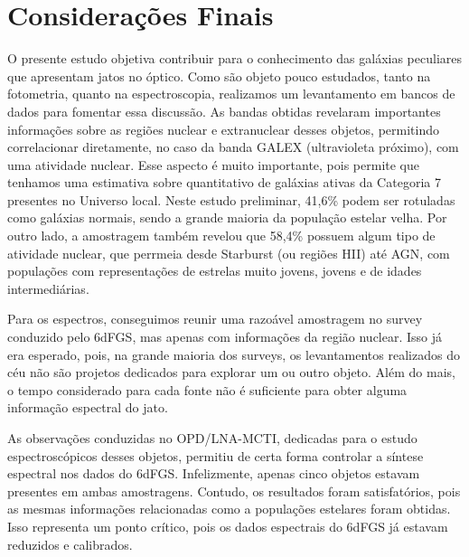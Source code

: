 
\chapter{Considerações Finais}

O presente estudo objetiva contribuir para o conhecimento das galáxias peculiares que apresentam jatos no óptico. Como são objeto pouco estudados, tanto na fotometria, quanto na espectroscopia, realizamos um levantamento em bancos de dados para fomentar essa discussão. As bandas obtidas revelaram importantes informações sobre as regiões nuclear e extranuclear desses objetos, permitindo correlacionar diretamente, no caso da banda GALEX (ultravioleta próximo), com uma atividade nuclear. Esse aspecto é muito importante, pois permite que tenhamos uma estimativa sobre quantitativo de galáxias ativas da Categoria 7 presentes no Universo local. Neste estudo preliminar, 41,6\% podem ser rotuladas como galáxias normais, sendo a grande maioria da população estelar velha. Por outro lado, a amostragem também revelou que 58,4\% possuem algum tipo de atividade nuclear, que perrmeia desde Starburst (ou regiões HII) até AGN, com populações com representações de estrelas muito jovens, jovens e de idades intermediárias.

Para os espectros, conseguimos reunir uma razoável amostragem no survey conduzido pelo 6dFGS, mas apenas com informações da região nuclear. Isso já era esperado, pois, na grande maioria dos surveys, os levantamentos realizados do céu não são projetos dedicados para explorar um ou outro objeto. Além do mais, o tempo considerado para cada fonte não é suficiente para obter alguma informação espectral do jato.

As observações conduzidas no OPD/LNA-MCTI, dedicadas para o estudo espectroscópicos desses objetos, permitiu de certa forma controlar a síntese espectral nos dados do 6dFGS. Infelizmente, apenas cinco objetos estavam presentes em ambas amostragens. Contudo, os resultados foram satisfatórios, pois as mesmas informações relacionadas como a populações estelares foram obtidas. Isso representa um ponto crítico, pois os dados espectrais do 6dFGS já estavam reduzidos e calibrados.

